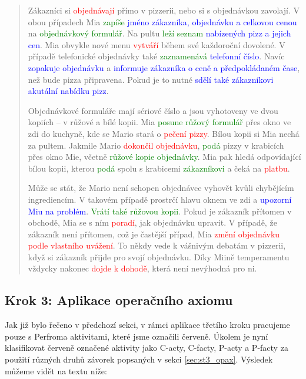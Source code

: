 \documentclass[]{article}
\begin{document}
\begin{quote}
Zákazníci si \textcolor{red}{objednávají} přímo v pizzerii, nebo si s objednávkou zavolají. V obou případech Mia \textcolor{green}{zapíše} \textcolor{blue}{jméno zákazníka, objednávku a celkovou cenou} na \textcolor{green}{objednávkový formulář}. Na pultu \textcolor{green}{leží seznam} \textcolor{blue}{nabízených pizz a jejich cen}. Mia obvykle nové menu \textcolor{red}{vytváří} během své každoroční dovolené. V případě telefonické objednávky také \textcolor{green}{zaznamenává} \textcolor{blue}{telefonní číslo}. Navíc \textcolor{blue}{zopakuje objednávku} a \textcolor{blue}{informuje zákazníka o ceně a předpokládaném čase}, než bude pizza připravena. Pokud je to nutné \textcolor{blue}{sdělí také zákazníkovi akutální nabídku pizz}. 

Objednávkové formuláře mají sériové číslo a jsou vyhotoveny ve dvou kopiích – v růžové a bílé kopii. Mia \textcolor{green}{posune růžový formulář} přes okno ve zdi do kuchyně, kde se Mario stará o \textcolor{red}{pečení pizzy}. Bílou kopii si Mia nechá za pultem. Jakmile Mario \textcolor{red}{dokončil objednávku}, \textcolor{green}{podá} pizzy v krabicích přes okno Mie, včetně \textcolor{green}{růžové kopie objednávky}. Mia pak hledá odpovídající bílou kopii, kterou \textcolor{green}{podá} spolu s krabicemi \textcolor{green}{zákazníkovi} a čeká na \textcolor{red}{platbu}. 

Může se stát, že Mario není schopen objednávce vyhovět kvůli chybějícím ingrediencím. V takovém případě prostrčí hlavu oknem ve zdi a \textcolor{blue}{upozorní Miu na problém}. \textcolor{green}{Vrátí také růžovou kopii}. Pokud je zákazník přítomen v obchodě, Mia se s ním \textcolor{red}{poradí}, jak objednávku upravit. V případě, že zákazník není přítomen, což je častější případ, Mia \textcolor{red}{změní objednávku podle vlastního uvážení}. To někdy vede k vášnivým debatám v pizzerii, když si zákazník přijde pro svojí objednávku. Díky Miině temperamentu vždycky nakonec \textcolor{red}{dojde k dohodě}, která není nevýhodná pro ni.
\end{quote}

\subsection{Krok 3: Aplikace operačního axiomu}
Jak již bylo řečeno v předchozí sekci, v rámci aplikace třetího kroku pracujeme pouze s Perfroma aktivitami, které jsme označili červeně. Úkolem je nyní klasifikovat červeně označené aktivity jako C-acty, C-facty, P-acty a P-facty za použití různých druhů závorek popsaných v sekci \ref{sec:st3_opax}. Výsledek můžeme vidět na textu níže:
\end{document}

